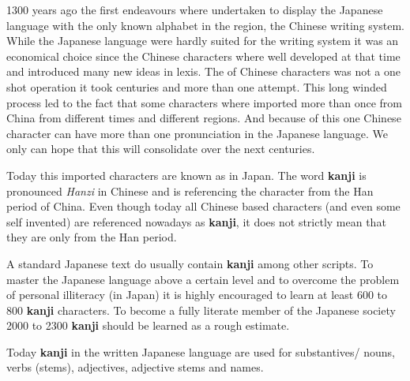 

1300 years ago the first endeavours where undertaken to display the Japanese
language with the only known alphabet in the region, the Chinese writing
system. While the Japanese language were hardly suited for the writing system
it was an economical choice since the Chinese characters where well developed
at that time and introduced many new ideas in lexis. The
 of Chinese characters was not a one shot operation it
took centuries and more than one attempt. This long winded process led to the
fact that some characters where imported more than once from China from
different times and different regions.  And because of this one Chinese
character can have more than one pronunciation in the Japanese language.  We
only can hope that this will consolidate over the next centuries.

Today this imported characters are known as 
in Japan. The word \textbf{kanji} is pronounced \textit{Hanzi} in Chinese and
is referencing the character  from the Han
 period of China. Even though today all Chinese based
characters (and even some self invented) are referenced nowadays as
\textbf{kanji}, it does not strictly mean that they are only from the Han
period.

A standard Japanese text do usually contain \textbf{kanji} among other scripts.
To master the Japanese language above a certain level and to overcome the
problem of personal illiteracy (in Japan) it is highly encouraged to learn at
least 600 to 800 \textbf{kanji} characters. To become a fully literate member
of the Japanese society 2000 to 2300 \textbf{kanji} should be learned as a
rough estimate.

Today \textbf{kanji} in the written Japanese language are used for
substantives/ nouns, verbs (stems), adjectives, adjective stems and names.
